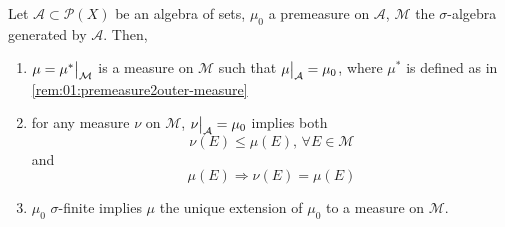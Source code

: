 \begin{thm}\label{thm:1.14}\label{thm:premeasure-to-measure}
  Let ${\mathcal{A}\subset\mathscr{P}(X)}$ be an algebra of sets,
  $\mu_0$ a premeasure on $\mathcal{A}$,
  $\mathcal{M}$ the $\sigma$-algebra generated by $\mathcal{A}$.
  Then,
  \begin{enumerate}
  \item\label{thm:premeasure-to-measure:itm:1}
    ${\mu = \restr{\mu^*}{\mathcal{M}}}$ is a measure on $\mathcal{M}$
    such that ${\restr{\mu}{\mathcal{A}}=\mu_0}$,
    where $\mu^*$ is defined as in \ref{rem:01:premeasure2outer-measure}
  \item\label{thm:premeasure-to-measure:itm:2}
    for any measure $\nu$ on $\mathcal{M}$,
    ${\restr{\nu}{\mathcal{A}}=\mu_0}$ implies both
    \[ \nu(E)\leq\mu(E),\,\forall E\in\mathcal{M} \]
    and
    \[ \mu(E)\Rightarrow \nu(E)=\mu(E) \]
  \item\label{thm:premeasure-to-measure:itm:3}
    $\mu_0$ $\sigma$-finite implies
    $\mu$ the unique extension of $\mu_0$ to a measure on $\mathcal{M}$.
  \end{enumerate}
\end{thm}
